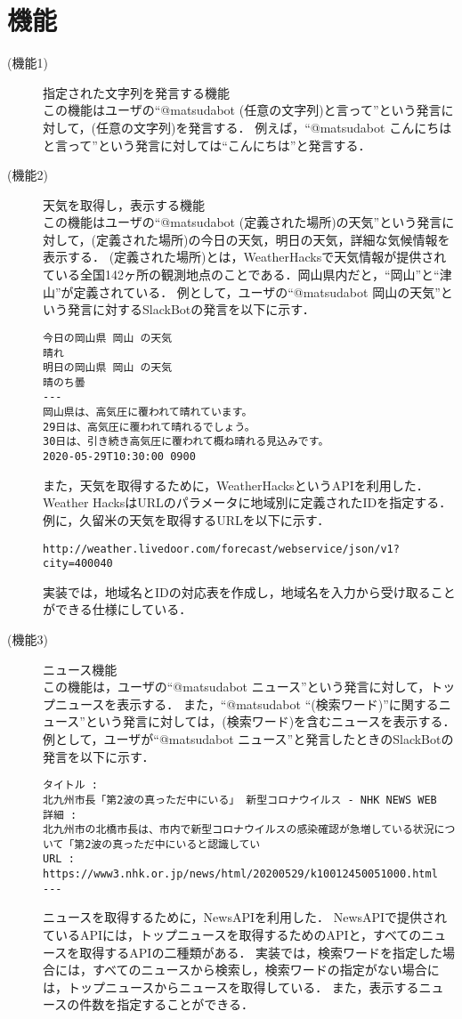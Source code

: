 \documentclass[12pt]{jsarticle}
\begin{document}
\section{機能}
\begin{description}
\item[(機能1)] 指定された文字列を発言する機能\\
この機能はユーザの``@matsudabot (任意の文字列)と言って''という発言に対して，(任意の文字列)を発言する．
例えば，``@matsudabot こんにちはと言って''という発言に対しては``こんにちは''と発言する．

\item[(機能2)] 天気を取得し，表示する機能\\
この機能はユーザの``@matsudabot (定義された場所)の天気''という発言に対して，(定義された場所)の今日の天気，明日の天気，詳細な気候情報を表示する．
(定義された場所)とは，WeatherHacksで天気情報が提供されている全国142ヶ所の観測地点のことである．岡山県内だと，``岡山''と``津山''が定義されている．
例として，ユーザの``@matsudabot 岡山の天気''という発言に対するSlackBotの発言を以下に示す．
\begin{verbatim}
今日の岡山県 岡山 の天気
晴れ
明日の岡山県 岡山 の天気
晴のち曇
---
岡山県は、高気圧に覆われて晴れています。
29日は、高気圧に覆われて晴れるでしょう。
30日は、引き続き高気圧に覆われて概ね晴れる見込みです。
2020-05-29T10:30:00 0900
\end{verbatim}
		また，天気を取得するために，WeatherHacks\cite{WeatherHacks}というAPIを利用した．
Weather HacksはURLのパラメータに地域別に定義されたIDを指定する．
例に，久留米の天気を取得するURLを以下に示す．
\begin{verbatim}
http://weather.livedoor.com/forecast/webservice/json/v1?city=400040
\end{verbatim}
実装では，地域名とIDの対応表を作成し，地域名を入力から受け取ることができる仕様にしている．

\item[(機能3)] ニュース機能\\
この機能は，ユーザの``@matsudabot ニュース''という発言に対して，トップニュースを表示する．
また，``@matsudabot ``(検索ワード)''に関するニュース''という発言に対しては，(検索ワード)を含むニュースを表示する．
例として，ユーザが``@matsudabot ニュース''と発言したときのSlackBotの発言を以下に示す．
\begin{verbatim}
タイトル :
北九州市長「第2波の真っただ中にいる」 新型コロナウイルス - NHK NEWS WEB
詳細 :
北九州市の北橋市長は、市内で新型コロナウイルスの感染確認が急増している状況について「第2波の真っただ中にいると認識してい
URL :
https://www3.nhk.or.jp/news/html/20200529/k10012450051000.html
---
\end{verbatim}
ニュースを取得するために，NewsAPI\cite{NewsAPI}を利用した．
NewsAPIで提供されているAPIには，トップニュースを取得するためのAPIと，すべてのニュースを取得するAPIの二種類がある．
実装では，検索ワードを指定した場合には，すべてのニュースから検索し，検索ワードの指定がない場合には，トップニュースからニュースを取得している．
また，表示するニュースの件数を指定することができる．


\end{description}
\end{document}
